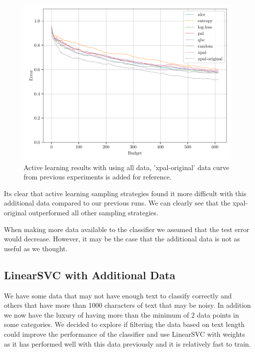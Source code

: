 \begin{figure}[ht]
  \centering
  \includegraphics[width=\scale\textwidth]{../img/plot_all_data_new_vectorizer_test_results.pdf}
  \caption{Active learning results with using all data, 'xpal-original' data curve from previous experiments is added for reference.}
  \label{fig:active_learning_new_data_new_vect}
\end{figure}

Its clear that active learning sampling strategies found it more difficult with this additional data compared to our previous runs. We can clearly see that the xpal-original outperformed all other sampling strategies.

When making more data available to the classifier we assumed that the test error would decrease. However, it may be the case that the additional data is not as useful as we thought.

\subsection{LinearSVC with Additional Data}

We have some data that may not have enough text to classify correctly and others that have more than 1000 characters of text that may be noisy. In addition we now have the luxury of having more than the minimum of 2 data points in some categories. We decided to explore if filtering the data based on text length could improve the performance of the classifier and use LinearSVC with weights as it has performed well with this data previously and it is relatively fast to train.

